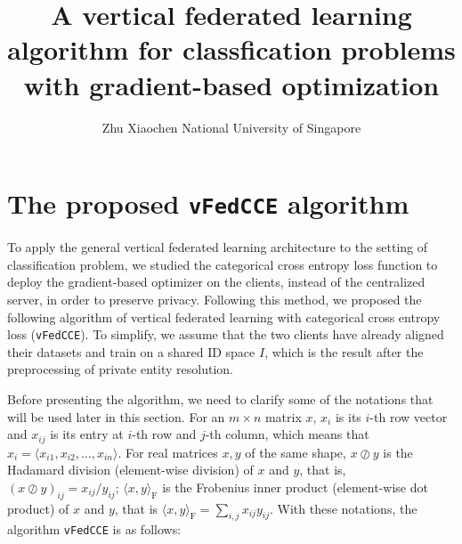 \documentclass{article}
\title{A vertical federated learning algorithm for classfication problems with gradient-based optimization}
\author{Zhu Xiaochen \qquad National University of Singapore}
\date{}
\begin{document}
\maketitle
\section{The proposed \texttt{vFedCCE} algorithm}\label{vfedcce}
  To apply the general vertical federated learning architecture to the setting of classification problem, we studied the categorical cross entropy loss function to deploy the gradient-based optimizer on the clients, instead of the centralized server, in order to preserve privacy. Following this method, we proposed the following algorithm of vertical federated learning with categorical cross entropy loss (\texttt{vFedCCE}). To simplify, we assume that the two clients have already aligned their datasets and train on a shared ID space $I$, which is the result after the preprocessing of private entity resolution.

  Before presenting the algorithm, we need to clarify some of the notations that will be used later in this section. For an $m\times n$ matrix $x$, $x_i$ is its $i$-th row vector and $x_{ij}$ is its entry at $i$-th row and $j$-th column, which means that $x_i=\langle x_{i1},x_{i2},\ldots,x_{in}\rangle$. For real matrices $x,y$ of the same shape, $x\oslash y$ is the Hadamard division (element-wise division) of $x$ and $y$, that is, $(x\oslash y)_{ij}={x_{ij}}/{y_{ij}}$; $\langle x,y\rangle_\mathrm{F}$ is the Frobenius inner product (element-wise dot product) of $x$ and $y$, that is $\langle x,y\rangle_\mathrm{F}=\sum_{i,j}x_{ij}y_{ij}$. With these notations, the algorithm \texttt{vFedCCE} is as follows:
\end{document}
